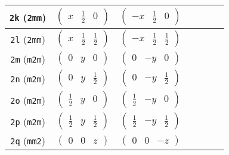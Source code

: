 \documentclass[fleqn,9pt,landscape]{jsarticle}
\begin{document}
\begin{center}
\begin{longtable}{ccccccc}
{\tt 2k} ({\tt 2mm}) & $ \begin{pmatrix} x & \frac{1}{2} & 0 \end{pmatrix} $ & $ \begin{pmatrix} - x & \frac{1}{2} & 0 \end{pmatrix} $ & $  $ & $  $ & $  $ & $  $ \\ \hline
{\tt 2l} ({\tt 2mm}) & $ \begin{pmatrix} x & \frac{1}{2} & \frac{1}{2} \end{pmatrix} $ & $ \begin{pmatrix} - x & \frac{1}{2} & \frac{1}{2} \end{pmatrix} $ & $  $ & $  $ & $  $ & $  $ \\ \hline
{\tt 2m} ({\tt m2m}) & $ \begin{pmatrix} 0 & y & 0 \end{pmatrix} $ & $ \begin{pmatrix} 0 & - y & 0 \end{pmatrix} $ & $  $ & $  $ & $  $ & $  $ \\ \hline
{\tt 2n} ({\tt m2m}) & $ \begin{pmatrix} 0 & y & \frac{1}{2} \end{pmatrix} $ & $ \begin{pmatrix} 0 & - y & \frac{1}{2} \end{pmatrix} $ & $  $ & $  $ & $  $ & $  $ \\ \hline
{\tt 2o} ({\tt m2m}) & $ \begin{pmatrix} \frac{1}{2} & y & 0 \end{pmatrix} $ & $ \begin{pmatrix} \frac{1}{2} & - y & 0 \end{pmatrix} $ & $  $ & $  $ & $  $ & $  $ \\ \hline
{\tt 2p} ({\tt m2m}) & $ \begin{pmatrix} \frac{1}{2} & y & \frac{1}{2} \end{pmatrix} $ & $ \begin{pmatrix} \frac{1}{2} & - y & \frac{1}{2} \end{pmatrix} $ & $  $ & $  $ & $  $ & $  $ \\ \hline
{\tt 2q} ({\tt mm2}) & $ \begin{pmatrix} 0 & 0 & z \end{pmatrix} $ & $ \begin{pmatrix} 0 & 0 & - z \end{pmatrix} $ & $  $ & $  $ & $  $ & $  $ \\ \hline

\end{longtable}
\end{center}
\end{document}
